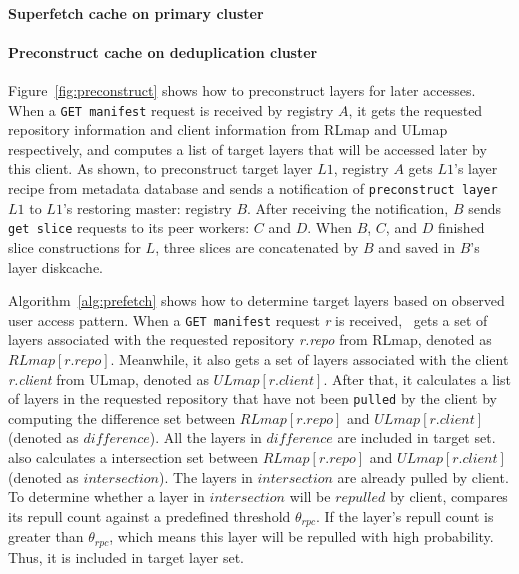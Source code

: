 \paragraph{Superfetch cache  on primary cluster} 



\paragraph{Preconstruct cache on deduplication cluster}


Figure~\ref{fig:preconstruct}
shows how to preconstruct layers for later accesses.
When a \texttt{GET manifest} request is received by registry $A$,
it gets the requested repository information and client information from RLmap and ULmap respectively, 
and computes a list of target layers that will be accessed later by this client.
As shown, to preconstruct target layer $L1$, 
registry $A$ gets $L1$'s layer recipe from metadata database
and sends a notification of \texttt{preconstruct layer} $L1$ to 
$L1$'s restoring master: registry $B$. 
After receiving the notification, 
$B$ sends \texttt{get slice} requests to its peer workers: $C$ and $D$.
When $B$, $C$, and $D$ finished slice constructions for $L$,
three slices are concatenated by $B$ and saved in $B$'s layer diskcache. 

Algorithm~\ref{alg:prefetch} shows how to determine target layers 
based on observed user access pattern.
When a \texttt{GET manifest} request \emph{r} is received,
\sysname~gets a set of layers associated with the requested repository \emph{r.repo} from RLmap, 
denoted as $RLmap[r.repo]$.
Meanwhile, it also gets a set of layers associated with the client \emph{r.client} from ULmap,
denoted as $ULmap[r.client]$.
After that, it calculates a list of layers in the requested repository 
that have not been \texttt{pulled} by the client by
computing the difference set between $RLmap[r.repo]$ and $ULmap[r.client]$ (denoted as $difference$).
All the layers in $difference$ are included in target set.
\sysname also calculates a intersection set between 
$RLmap[r.repo]$ and $ULmap[r.client]$ (denoted as $intersection$).
The layers in $intersection$ are already pulled by client.
To determine whether a layer in $intersection$ will be
$repulled$ by client,
\sysname compares its repull count against a predefined threshold $\theta_{rpc}$.
If the layer's repull count is greater than $\theta_{rpc}$,
which means this layer will be repulled with high probability.
Thus, it is included in target layer set.

